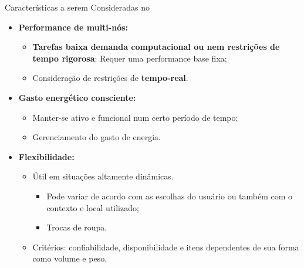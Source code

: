       
      \begin{frame}{\Wearables}{Características a serem Consideradas no \Design} \vspace{-1em}
         
         \begin{itemize}
            \setlength{\itemsep}{0.9em}
            \item \textbf{Performance de multi-nós:} 
            \begin{itemize} \setlength{\itemsep}{0.4em}
               \item \textbf{Tarefas baixa demanda computacional ou nem restrições de tempo rigorosa}: Requer uma performance base fixa;
               
               \item Consideração de restrições de \textbf{tempo-real}.
            \end{itemize}
            
            \item \textbf{Gasto energético consciente:} 
            \begin{itemize} \setlength{\itemsep}{0.4em}
               \item Manter-se ativo e funcional num certo período de tempo;
               \item Gerenciamento do gasto de energia.
               
            \end{itemize}
            
            \item \textbf{Flexibilidade:}
            \begin{itemize} \setlength{\itemsep}{0.4em}
               \item Útil em situações altamente dinâmicas.
               \begin{itemize}
                  \item Pode variar de acordo com as escolhas do usuário ou também com o contexto e local utilizado;
                  \item Trocas de roupa.
               \end{itemize}
               \item Critérios: confiabilidade, disponibilidade e itens dependentes de sua forma como volume e peso.
            \end{itemize}
         \end{itemize}
      \end{frame}
      

